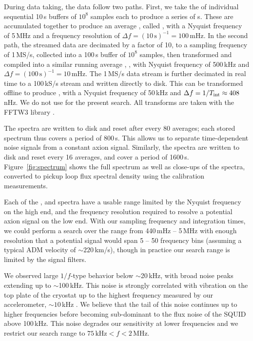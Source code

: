 \documentclass[aps,prl,amsmath,amssymb,reprint,superscriptaddress, nofootinbib,
]{revtex4-1}
\begin{document}
During data taking, the data follow two paths. First, we take the \DFT of individual sequential 10\,s buffers of $10^8$ samples each to produce a series of {\PSD}s. These are accumulated together to produce an average \PSD, called \Pten, with a Nyquist frequency of 5\,MHz and a frequency resolution of $\Delta f=(10\,\mathrm{s})^{-1}=100$\,mHz. In the second path, the streamed data are decimated by a factor of 10, to a sampling frequency of 1\,MS/s, collected into a 100\,s buffer of $10^8$ samples, then transformed and compiled into a similar running average \PSD, \Pone, with Nyquist frequency of 500\,kHz and $\Delta f=(100\,\mathrm{s})^{-1}=10$\,mHz. The 1\,MS/s data stream is further decimated in real time to a 100\,kS/s stream and written directly to disk. This can be transformed offline to produce \Phun, with a Nyquist frequency of 50\,kHz and $\Delta f=1/T_{\rm int}\approx 408$\,nHz. We do not use \Phun for the present search. All \DFT transforms are taken with the FFTW3 library \cite{FFTW05}. 

The \Pten spectra are written to disk and reset after every 80 averages; each stored spectrum thus covers a period of 800\,s. This allows us to separate time-dependent noise signals from a constant axion signal. Similarly, the \Pone spectra are written to disk and reset every 16 averages, and cover a period of 1600\,s.  Figure~\ref{fig:spectrum} shows the full \Pten spectrum as well as close-ups of the \Pone spectra, converted to pickup loop flux spectral density using the calibration measurements. 

Each of the \Pten, \Pone and \Phun spectra have a usable range limited by the Nyquist frequency on the high end, and the frequency resolution required to resolve a potential axion signal on the low end. With our sampling frequency and integration times, we could perform a search over the range from 440\,mHz -- 5\,MHz with enough resolution that a potential signal would span 5 -- 50 frequency bins (assuming a typical ADM velocity of $\sim220$\,km/s), though in practice our search range is limited by the signal filters. 

We observed large $1/f$-type behavior below $\sim$20\,kHz, with broad noise peaks extending up to $\sim$100\,kHz. This noise is strongly correlated with vibration on the top plate of the cryostat up to the highest frequency measured by our accelerometer, $\sim10$\,kHz \cite{ABRA_10cm_Technical}. We believe that the tail of this noise continues up to higher frequencies before becoming sub-dominant to the flux noise of the SQUID above 100\,kHz. This noise degrades our sensitivity at lower frequencies and we restrict our search range to \mbox{$75\,\mathrm{kHz} < f < 2\,\mathrm{MHz}$}.
\end{document}
